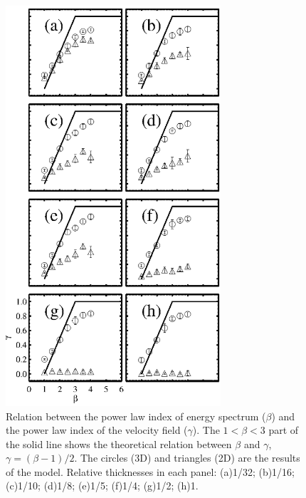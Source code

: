 \documentclass[iop,revtex4]{emulateapj}
\begin{document}
\begin{figure}[htbp]
\centering
\includegraphics[width=8cm]{beta_gamma_all.eps}
\caption{Relation between the power law index of energy spectrum ($\beta$) and the power law index of the velocity field ($\gamma$). The $1< \beta <3$ part of the solid line shows the theoretical relation between $\beta$ and $\gamma$, $\gamma=(\beta-1)/2$. The circles (3D) and triangles (2D) are the results of the model. Relative thicknesses in each panel: (a)1/32; (b)1/16; (c)1/10; (d)1/8; (e)1/5; (f)1/4; (g)1/2; (h)1.
\label{compare_4_8_16_32_64_128}}
\end{figure}


\end{document}
